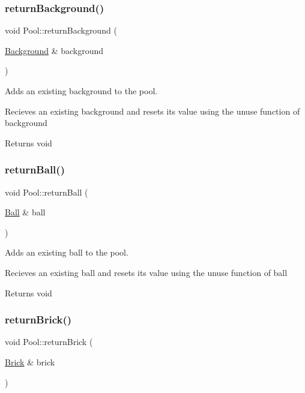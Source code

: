 \subsubsection{\texorpdfstring{return\+Background()}{returnBackground()}}
{\footnotesize\ttfamily void Pool\+::return\+Background (\begin{DoxyParamCaption}\item[{\hyperlink{class_background}{Background} \&}]{background }\end{DoxyParamCaption})}



Adds an existing background to the pool. 

Recieves an existing background and resets it\textquotesingle{}s value using the unuse function of background

\begin{DoxyReturn}{Returns}
void 
\end{DoxyReturn}
\mbox{\label{class_pool_a0da5595d7b9e70aed2dd807ee4a6ae26}} 
\subsubsection{\texorpdfstring{return\+Ball()}{returnBall()}}
{\footnotesize\ttfamily void Pool\+::return\+Ball (\begin{DoxyParamCaption}\item[{\hyperlink{class_ball}{Ball} \&}]{ball }\end{DoxyParamCaption})}



Adds an existing ball to the pool. 

Recieves an existing ball and resets it\textquotesingle{}s value using the unuse function of ball

\begin{DoxyReturn}{Returns}
void 
\end{DoxyReturn}
\mbox{\label{class_pool_a0d8fb68bad74c14b0130a96032cc5067}} 
\subsubsection{\texorpdfstring{return\+Brick()}{returnBrick()}}
{\footnotesize\ttfamily void Pool\+::return\+Brick (\begin{DoxyParamCaption}\item[{\hyperlink{class_brick}{Brick} \&}]{brick }\end{DoxyParamCaption})}



